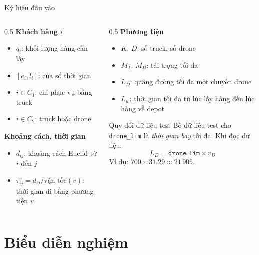 \documentclass[aspectratio=169]{beamer}
\begin{document}
\begin{frame}{Ký hiệu đầu vào}
  \begin{columns}[T]
    \begin{column}{0.5\textwidth}
      \textbf{Khách hàng $i$}
      \begin{itemize}
        \item \small $q_i$: khối lượng hàng cần lấy
        \item \small $[e_i, l_i]$: cửa sổ thời gian
        \item \small $i \in C_1$: chỉ phục vụ bằng truck
        \item \small $i \in C_2$: truck hoặc drone
      \end{itemize}
      \textbf{Khoảng cách, thời gian}
      \begin{itemize}
        \item \small $d_{ij}$: khoảng cách Euclid từ $i$ đến $j$
        \item \small $\tau^v_{ij} = d_{ij} / \text{vận tốc}(v)$: thời gian đi bằng phương tiện $v$
      \end{itemize}
    \end{column}
    \begin{column}{0.5\textwidth}
      \textbf{Phương tiện}
      \begin{itemize}
        \item \small $K$, $D$: số truck, số drone
        \item \small $M_T$, $M_D$: tải trọng tối đa
        \item \small $L_D$: quãng đường tối đa một chuyến drone
        \item \small $L_w$: thời gian tối đa từ lúc lấy hàng đến lúc hàng về depot
      \end{itemize}
      \begin{alertblock}{Quy đổi dữ liệu test}
        \small Bộ dữ liệu test cho \texttt{drone\_lim} là \emph{thời gian bay} tối đa. Khi đọc dữ liệu:
        $$L_D = \texttt{drone\_lim} \times v_D$$
        Ví dụ: $700 \times 31.29 \approx 21\,905$.
      \end{alertblock}
    \end{column}
  \end{columns}
\end{frame}

\section{Biểu diễn nghiệm}
\end{document}
